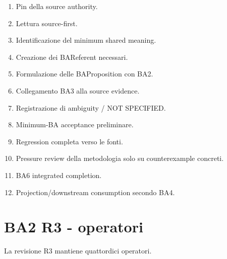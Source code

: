 \documentclass[11pt,a4paper]{article}
\begin{document}
\begin{enumerate}
\item Pin della source authority.
\item Lettura source-first.
\item Identificazione del minimum shared meaning.
\item Creazione dei BAReferent necessari.
\item Formulazione delle BAProposition con BA2.
\item Collegamento BA3 alla source evidence.
\item Registrazione di ambiguity / NOT SPECIFIED.
\item Minimum-BA acceptance preliminare.
\item Regression completa verso le fonti.
\item Pressure review della metodologia solo su counterexample concreti.
\item BA6 integrated completion.
\item Projection/downstream consumption secondo BA4.
\end{enumerate}

\section{BA2 R3 - operatori}

La revisione R3 mantiene quattordici operatori.
\end{document}
